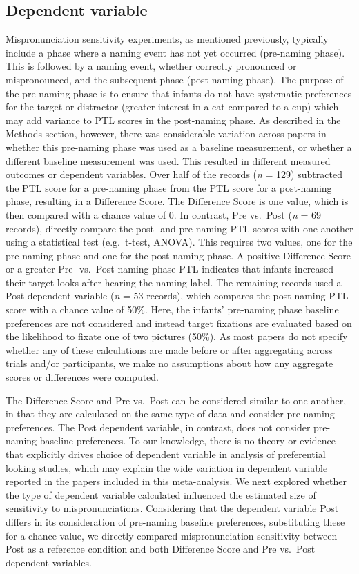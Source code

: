 \documentclass[man]{apa6}
\begin{document}
\hypertarget{dependent-variable}{%
\subsection{Dependent variable}\label{dependent-variable}}

Mispronunciation sensitivity experiments, as mentioned previously, typically include a phase where a naming event has not yet occurred (pre-naming phase). This is followed by a naming event, whether correctly pronounced or mispronounced, and the subsequent phase (post-naming phase). The purpose of the pre-naming phase is to ensure that infants do not have systematic preferences for the target or distractor (greater interest in a cat compared to a cup) which may add variance to PTL scores in the post-naming phase. As described in the Methods section, however, there was considerable variation across papers in whether this pre-naming phase was used as a baseline measurement, or whether a different baseline measurement was used. This resulted in different measured outcomes or dependent variables. Over half of the records (\emph{n} = 129) subtracted the PTL score for a pre-naming phase from the PTL score for a post-naming phase, resulting in a Difference Score. The Difference Score is one value, which is then compared with a chance value of 0. In contrast, Pre vs.~Post (\emph{n} = 69 records), directly compare the post- and pre-naming PTL scores with one another using a statistical test (e.g.~t-test, ANOVA). This requires two values, one for the pre-naming phase and one for the post-naming phase. A positive Difference Score or a greater Pre- vs.~Post-naming phase PTL indicates that infants increased their target looks after hearing the naming label. The remaining records used a Post dependent variable (\emph{n} = 53 records), which compares the post-naming PTL score with a chance value of 50\%. Here, the infants' pre-naming phase baseline preferences are not considered and instead target fixations are evaluated based on the likelihood to fixate one of two pictures (50\%). As most papers do not specify whether any of these calculations are made before or after aggregating across trials and/or participants, we make no assumptions about how any aggregate scores or differences were computed.

The Difference Score and Pre vs.~Post can be considered similar to one another, in that they are calculated on the same type of data and consider pre-naming preferences. The Post dependent variable, in contrast, does not consider pre-naming baseline preferences. To our knowledge, there is no theory or evidence that explicitly drives choice of dependent variable in analysis of preferential looking studies, which may explain the wide variation in dependent variable reported in the papers included in this meta-analysis. We next explored whether the type of dependent variable calculated influenced the estimated size of sensitivity to mispronunciations. Considering that the dependent variable Post differs in its consideration of pre-naming baseline preferences, substituting these for a chance value, we directly compared mispronunciation sensitivity between Post as a reference condition and both Difference Score and Pre vs.~Post dependent variables.
\end{document}
